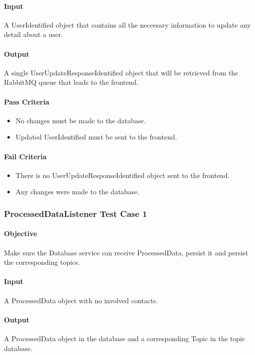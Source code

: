 \documentclass[hidelinks,english]{article}
\begin{document}
				\paragraph{Input} A UserIdentified object that contains all the neccesary information to update any detail about a user.
				\paragraph{Output} A single UserUpdateResponseIdentified object that will be retrieved from the RabbitMQ queue that leads to the frontend.
				\paragraph{Pass Criteria}
				\begin{itemize}
					\item No changes must be made to the database.
					\item Updated UserIdentified must be sent to the frontend.
				\end{itemize}
				\paragraph{Fail Criteria}
				\begin{itemize}
					\item There is no UserUpdateResponseIdentified object sent to the frontend.
					\item Any changes were made to the database.
				\end{itemize}
				
			\subsubsection{ProcessedDataListener Test Case 1}\label{databaseprocesseddatalistenertest1}
				\paragraph{Objective} Make sure the Database service can receive ProcessedData, persist it and persist the corresponding topics.
				\paragraph{Input} A ProcessedData object with no involved contacts.
				\paragraph{Output} A ProcessedData object in the database and a corresponding Topic in the topic database.
\end{document}
